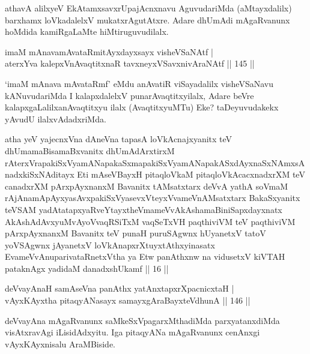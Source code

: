 \begin{artha}
athavA alilxyeV EkAtamxsavxrUpajAcnxnavu AguvudariMda (aMtayxdalilx)
barxhamx loVkadalelxV mukatxrAgutAtxre. Adare dhUmAdi mAgaRvanunx
hoMdida kamiRgaLaMte hiMtiruguvudilalx.
\end{artha}


\begin{shl}
imaM mAnavamAvataRmitAyxdayxsayx visheVSaNAtf | \\
aterxYva kalepxV\s nAvaqtitxnaR tavxneyxVSavxnivAraNAtf \hfill|| 145 || 
\end{shl}

\begin{artha}
`imaM mAnava mAvataRmf' eMdu anAvatiR viSayadalilx visheVSaNavu  kANuvudariMda I kalapxdalelxV punarAvaqtitxyilalx, Adare beVre  kalapxgaLalilx\break anAvaqtitxyu ilalx (AvaqtitxyuMTu) Eke? taDeyuvudakekx  yAvudU ilalxvAdadxriMda.
\end{artha}

\begin{kandikeshl}
atha yeV yajecnxVna dAneVna tapasA loVkAcnajxyanitx teV dhUmamaBisamaBxvanitx dhUmAdArxtirxM rAterxVrapakiSxVyamANapakaSxmapakiSxVyamANapakASxdAyxnaSxNAmxsAnadxkiSxNAditayx Eti mAseVBayxH pitaqloVkaM pitaqloVkAcacxnadxrXM teV canadxrXM pArxpAyxnanxM Bavanitx tAMsatxtarx deVvA yathA soVmaM rAjAnamApAyxyasAvxpakiSxVyasevxVteyxVvameVnAMsatxtarx BakaSxyanitx teVSAM yadA\break tatapxyaRveYtayxtheVmameVvAkAshamaBiniSapxdayxnatx AkAshAdAvxyuM\break vAyoVvaqRSiTxM vaqSeTxVH paqthiviVM teV paqthiviVM pArxpAyxnanxM Bavanitx teV punaH puruSAgwnx hUyanetxV tatoV yoVSAgwnx jAyanetxV loVkAnapxrXtuyxtAthxyinasatx EvameVvAnuparivataRnetxV\s tha ya Etw panAthxnw na vidusetxV kiVTAH pataknAgx yadidaM danadxshUkamf || 16 ||
\end{kandikeshl}

\begin{shl}
deVvayAnaH samAseVna panAthx yatAnxtapxrXpacnicxtaH | \\
vAyxKAyx\s tha pitaqyANasayx samayxgAraBayxteV\s dhunA \hfill|| 146 || 
\end{shl}

\begin{artha}
deVvayAna mAgaRvanunx saMkeSxVpagarxMthadiMda parxyatanxdiMda
visAtxravAgi iLisidAdxyitu. Iga pitaqyANa mAgaRvanunx cenAnxgi
vAyxKAyxnisalu AraMBiside.
\end{artha}

